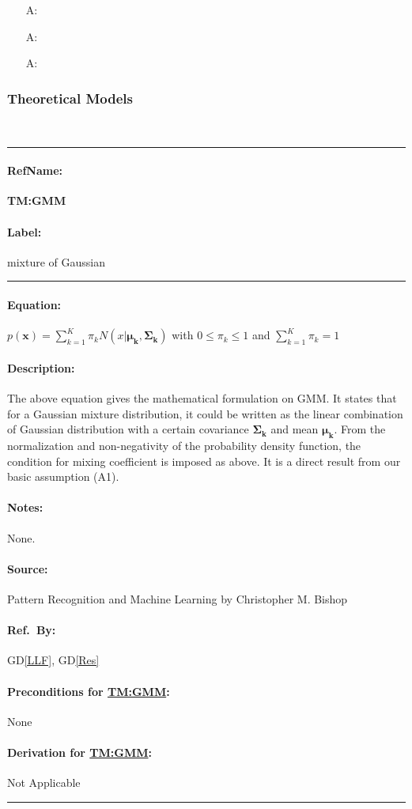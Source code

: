 \documentclass[12pt]{article}
\newcommand{\dref}[1]{GD\ref{#1}}
\newcounter{assumpnum} %
\newcommand{\deftheory}[9][Not Applicable]
{
\newpage
\noindent \rule{\textwidth}{0.5mm}

\paragraph{RefName: } \textbf{#2} \phantomsection 
\label{#2}

\paragraph{Label:} #3

\noindent \rule{\textwidth}{0.5mm}

\paragraph{Equation:}

#4

\paragraph{Description:}

#5

\paragraph{Notes:}

#6

\paragraph{Source:}

#7

\paragraph{Ref.\ By:}

#8

\paragraph{Preconditions for \hyperref[#2]{#2}:}
\label{#2_precond}

#9

\paragraph{Derivation for \hyperref[#2]{#2}:}
\label{#2_deriv}

#1

\noindent \rule{\textwidth}{0.5mm}

}
\begin{document}
\begin{itemize}

\item[A\refstepcounter{assumpnum}\theassumpnum \label{A_meaningfulLabel}:]
 
\item[A\refstepcounter{assumpnum}\theassumpnum \label{A_meaningfulLabel}:]

\item[A\refstepcounter{assumpnum}\theassumpnum \label{A_meaningfulLabel}:]
  
  
\end{itemize}

\subsubsection{Theoretical Models}\label{sec_theoretical}


~\newline

\noindent
\deftheory
{TM:GMM}
{mixture of Gaussian }
{
  $p(\textbf{x}) = \sum_{k=1}^{K}  \pi_{k} N(x | \mathbf{\mu_{k}} , \mathbf{\Sigma_{k}} )$ with 
  $ 0 \leq \pi_{k} \leq 1 $ and $\sum_{k=1}^{K}\pi_{k} = 1 $
}
{
  The above equation gives the mathematical formulation on GMM. It states that for a Gaussian mixture distribution, it could be written as the linear combination of Gaussian distribution with a certain covariance  {$\mathbf{\Sigma_{k}}$} and mean $\mathbf{\mu_{k}}$. From the normalization and non-negativity of the probability density function, the condition for mixing coefficient is imposed as above. It is a direct result from our basic assumption (A1). 
}
{
None.
}
{
  Pattern Recognition and Machine Learning by Christopher M. Bishop
}
{
  \dref{LLF},  \dref{Res}
}
{
None
}
{}

~\newline
\end{document}
